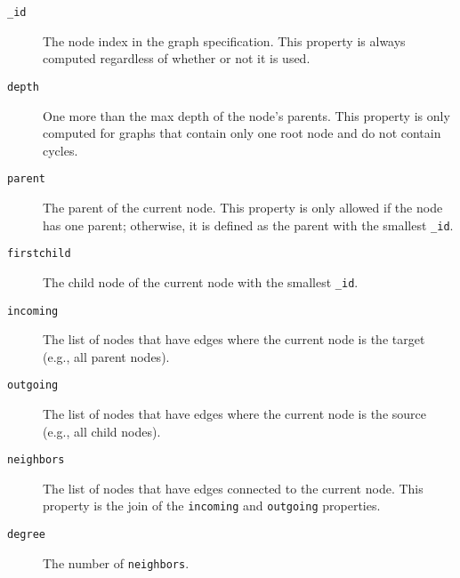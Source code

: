 \begin{description}
\item[\texttt{\_id}] The node index in the graph specification. This
  property is always computed regardless of whether or not it is used.
\item[\texttt{depth}] One more than the max depth of the node's
  parents. This property is only computed for graphs that contain only one
  root node and do not contain cycles.
\item[\texttt{parent}] The parent of the current node. This property is
  only allowed if the node has one parent; otherwise, it is defined as the
  parent with the smallest \texttt{\_id}.
\item[\texttt{firstchild}] The child node of the current node with the smallest \texttt{\_id}.
\item[\texttt{incoming}] The list of nodes that have edges where the
  current node is the target (e.g., all parent nodes).
\item[\texttt{outgoing}] The list of nodes that have edges where the
  current node is the source (e.g., all child nodes).
\item[\texttt{neighbors}] The list of nodes that have edges connected to
  the current node. This property is the join of the \texttt{incoming} and
  \texttt{outgoing} properties.
\item[\texttt{degree}] The number of \texttt{neighbors}.
\end{description}

